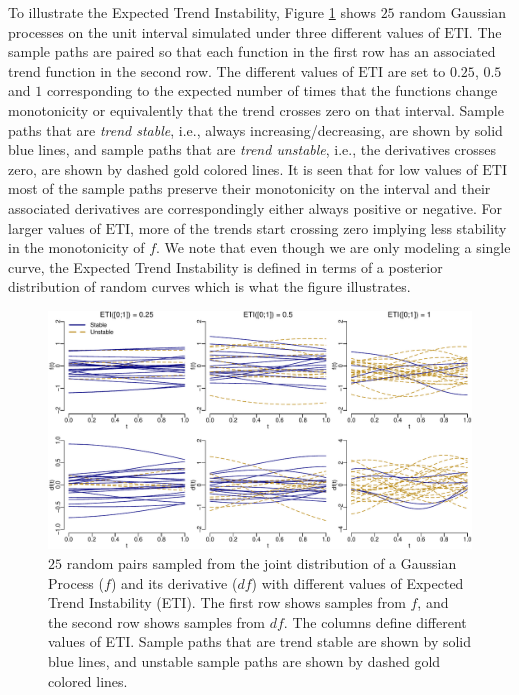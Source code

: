 \documentclass[11pt,]{article}
\theoremstyle{nonumberplain}
\begin{document}
To illustrate the Expected Trend Instability, Figure
\ref{fig:ETIexample} shows \(25\) random Gaussian processes on the unit
interval simulated under three different values of \(\mathrm{ETI}\). The
sample paths are paired so that each function in the first row has an
associated trend function in the second row. The different values of
\(\mathrm{ETI}\) are set to \(0.25\), \(0.5\) and \(1\) corresponding to
the expected number of times that the functions change monotonicity or
equivalently that the trend crosses zero on that interval. Sample paths
that are \textit{trend stable}, i.e., always increasing/decreasing, are
shown by solid blue lines, and sample paths that are
\textit{trend unstable}, i.e., the derivatives crosses zero, are shown
by dashed gold colored lines. It is seen that for low values of
\(\mathrm{ETI}\) most of the sample paths preserve their monotonicity on
the interval and their associated derivatives are correspondingly either
always positive or negative. For larger values of \(\mathrm{ETI}\), more
of the trends start crossing zero implying less stability in the
monotonicity of \(f\). We note that even though we are only modeling a
single curve, the Expected Trend Instability is defined in terms of a
posterior distribution of random curves which is what the figure
illustrates.

\begin{figure}[htb]
\center\includegraphics{ETIexample}
\caption{$25$ random pairs sampled from the joint distribution of a Gaussian Process ($f$) and its derivative ($df$) with different values of Expected Trend Instability (ETI). The first row shows samples from $f$, and the second row shows samples from $df$. The columns define different values of ETI. Sample paths that are trend stable are shown by solid blue lines, and unstable sample paths are shown by dashed gold colored lines.}
\label{fig:ETIexample}
\end{figure}
\end{document}
